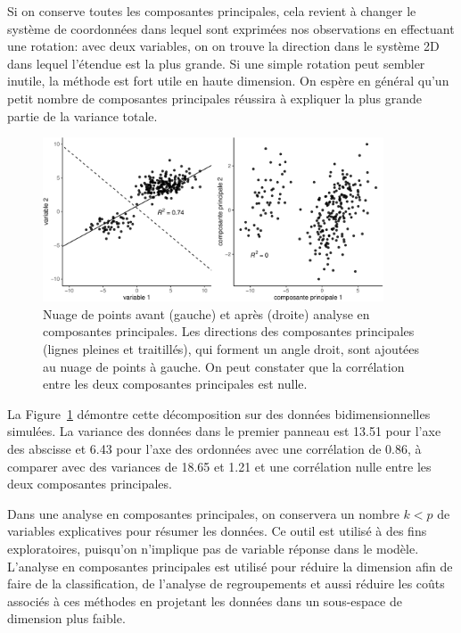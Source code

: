 \documentclass[
  11pt,
  letterpaper,
]{book}
\theoremstyle{definition}
\theoremstyle{remark}
\begin{document}
Si on conserve toutes les composantes principales, cela revient à
changer le système de coordonnées dans lequel sont exprimées nos
observations en effectuant une rotation: avec deux variables, on on
trouve la direction dans le système 2D dans lequel l'étendue est la plus
grande. Si une simple rotation peut sembler inutile, la méthode est fort
utile en haute dimension. On espère en général qu'un petit nombre de
composantes principales réussira à expliquer la plus grande partie de la
variance totale.

\begin{figure}[ht!]

{\centering \includegraphics[width=0.9\textwidth,height=\textheight]{./02-analysefactorielle_files/figure-pdf/fig-acprotation-1.pdf}

}

\caption{\label{fig-acprotation}Nuage de points avant (gauche) et après
(droite) analyse en composantes principales. Les directions des
composantes principales (lignes pleines et traitillés), qui forment un
angle droit, sont ajoutées au nuage de points à gauche. On peut
constater que la corrélation entre les deux composantes principales est
nulle.}

\end{figure}

La Figure~\ref{fig-acprotation} démontre cette décomposition sur des
données bidimensionnelles simulées. La variance des données dans le
premier panneau est 13.51 pour l'axe des abscisse et 6.43 pour l'axe des
ordonnées avec une corrélation de 0.86, à comparer avec des variances de
18.65 et 1.21 et une corrélation nulle entre les deux composantes
principales.

Dans une analyse en composantes principales, on conservera un nombre
\(k<p\) de variables explicatives pour résumer les données. Ce outil est
utilisé à des fins exploratoires, puisqu'on n'implique pas de variable
réponse dans le modèle. L'analyse en composantes principales est utilisé
pour réduire la dimension afin de faire de la classification, de
l'analyse de regroupements et aussi réduire les coûts associés à ces
méthodes en projetant les données dans un sous-espace de dimension plus
faible.
\end{document}
